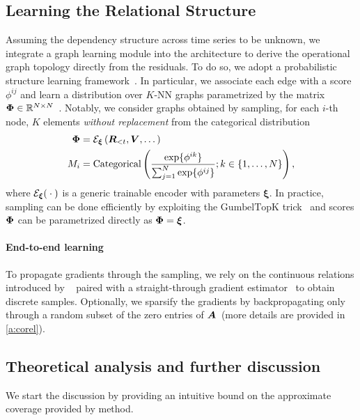 \subsection{Learning the Relational Structure}\label{sec:structure-learning}

Assuming the dependency structure across time series to be unknown, we integrate a graph learning module into the architecture to derive the operational graph topology directly from the residuals. To do so, we adopt a probabilistic structure learning framework~\cite{niculae2023discrete, cini2023sparse, manenti2024learning}. In particular, we associate each edge with a score $\phi^{ij}$ and learn a distribution over $K$-NN graphs parametrized by the matrix ${\bm{\Phi}} \in {\mathbb{R}}^{N\times N}$~\cite{cini2023sparse, kazi2022differentiable}. Notably, we consider graphs obtained by sampling, for each $i$-th node, $K$ elements \textit{without replacement} from the categorical distribution 
\begin{align}\label{eq:graph-sampler}
    {\bm{\Phi}} &= {\mathcal{E}}_{\bm{\xi}}\left({\bm{R}}_{<t}, {\bm{V}}, \dots\right)\\
    M_i &= \text{Categorical}\left(\frac{\exp\{\phi^{ik}\}}{\sum_{j=1}^N\exp\{\phi^{ij}\}};k \in \{1, \dots, N\}\right),
\end{align}
where ${\mathcal{E}}_{\bm{\xi}}({}\cdot{})$ is a generic trainable encoder with parameters $\bm{\xi}$. In practice, sampling can be done efficiently by exploiting the $\text{GumbelTopK}$ trick~\cite{kool2019stochastic} and scores ${\bm{\Phi}}$ can be parametrized directly as ${\bm{\Phi}} = \bm{\xi}$. 

\paragraph{End-to-end learning} To propagate gradients through the sampling, we rely on the continuous relations introduced by ~\citet{xie2019reparameterizable} paired with a straight-through gradient estimator~\cite{bengio2013estimating} to obtain discrete samples. Optionally, we sparsify the gradients by backpropagating only through a random subset of the zero entries of ${\bm{A}}$~({more details are provided in \autoref{a:corel}}). 

\subsection{Theoretical analysis and further discussion}\label{sec:discussion}

We start the discussion by providing an intuitive bound on the approximate coverage provided by \gls{method}. 

